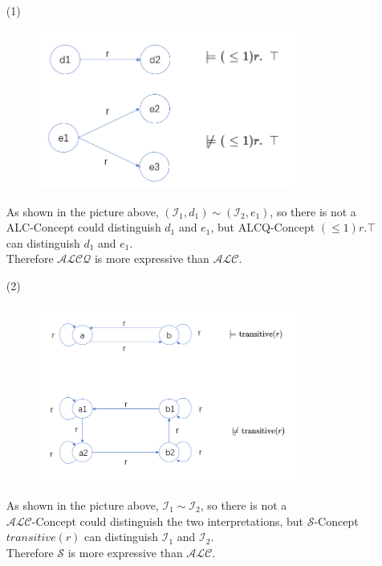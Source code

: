 \documentclass[12pt]{article}
\begin{document}
    \newpage
    \begin{enumerate}
        \item[(1)]
        \begin{figure}[h]
			\centering
			\includegraphics[width=0.8\textwidth]{11_1.png}\\
			\label{fig:roc}
			\end{figure}
        As shown in the picture above, $(\mathcal{I}_1, d_1) \sim (\mathcal{I}_2, e_1)$, so there is not a \\
        ALC-Concept could distinguish $d_1$ and $e_1$, but ALCQ-Concept $(\leq 1)r. \top$ can distinguish $d_1$ and $e_1$. \\
        Therefore $\mathcal{ALCQ}$ is more expressive than $\mathcal{ALC}$.
    \newpage
        \item[(2)]
        \begin{figure}[h]
			\centering
			\includegraphics[width=0.8\textwidth]{11_2.png}\\
			\label{fig:roc}
			\end{figure}
        As shown in the picture above, $\mathcal{I}_1 \sim \mathcal{I}_2$, so there is not a \\
        $\mathcal{ALC}$-Concept could distinguish the two interpretations, but $\mathcal{S}$-Concept $transitive(r)$ can distinguish $\mathcal{I}_1$ and $\mathcal{I}_2$. \\
        Therefore $\mathcal{S}$ is more expressive than $\mathcal{ALC}$.
    \end{enumerate}
\end{document}
